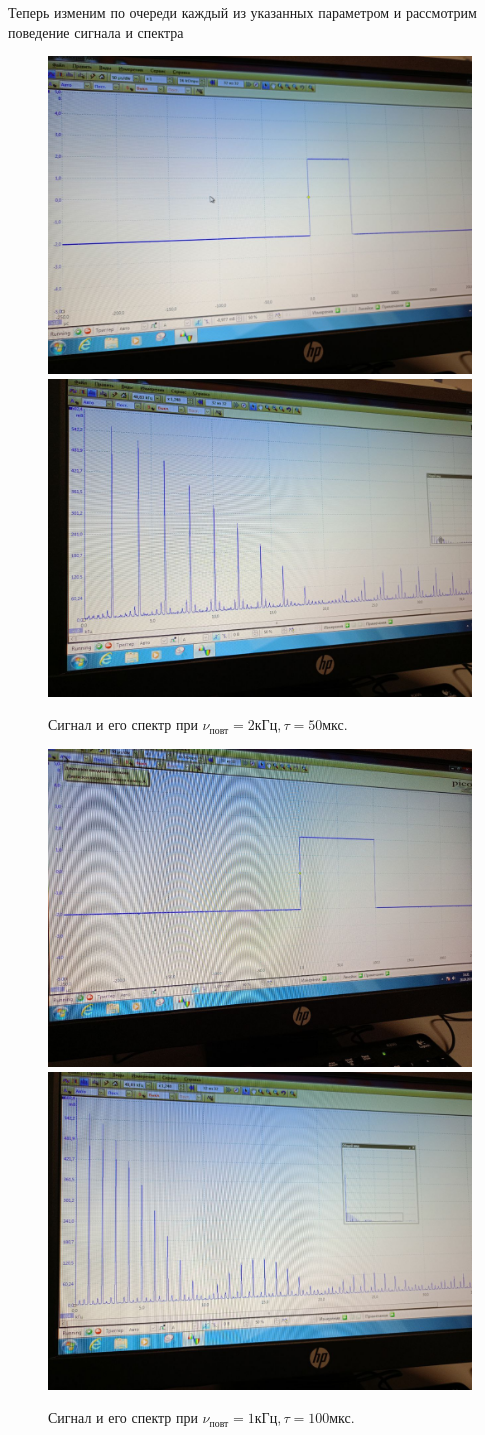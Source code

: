 \documentclass[a4paper,12pt]{article}
\begin{document}
Теперь изменим по очереди каждый из указанных параметром и рассмотрим поведение сигнала и спектра

\begin{figure}[H]
    \includegraphics[width=.5\textwidth]{A.6.2.graph}
    \includegraphics[width=.5\textwidth]{A.6.2.spectr}
    \caption{Сигнал и его спектр при $\nu_{\text{повт}} = 2 \text{кГц}, \tau = 50 \text{мкс}.$}\label{fig:foobar}
\end{figure}

\begin{figure}[H]
    \includegraphics[width=.5\textwidth]{A.6.3.graph}
    \includegraphics[width=.5\textwidth]{A.6.3.spectr}
    \caption{Сигнал и его спектр при $\nu_{\text{повт}} = 1 \text{кГц}, \tau = 100 \text{мкс}.$}\label{fig:foobar}
\end{figure}
\end{document}
